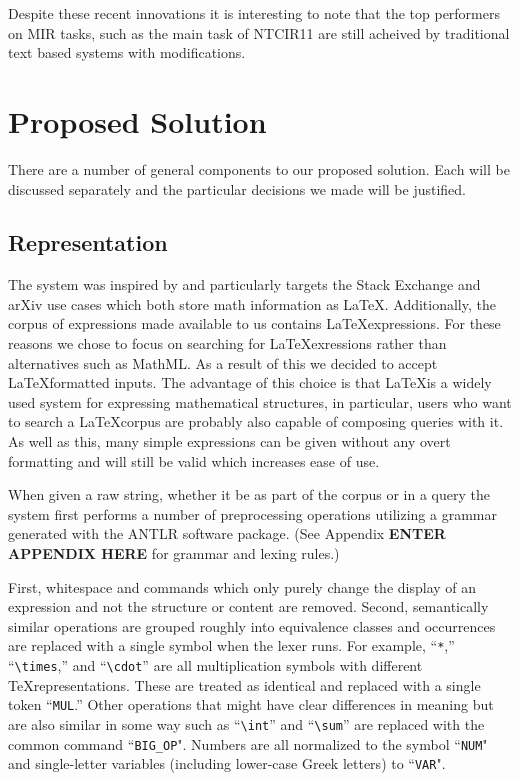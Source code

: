 \documentclass{sig-alternate}
\begin{document}
Despite these recent innovations it is interesting to note that the top performers on 
MIR tasks, such as the main task of NTCIR11 are still acheived by traditional text based
systems with modifications.

\section{Proposed Solution}
There are a number of general components to our proposed solution.
Each will be discussed separately and the particular 
decisions we made will be justified. 

\subsection{Representation}
The system was inspired by and particularly targets the Stack Exchange
and arXiv use cases which both store math information as LaTeX. 
Additionally, the corpus of expressions made available to us contains
\LaTeX expressions. For these reasons we chose to focus on searching
for \LaTeX exressions rather than alternatives such as MathML. As a 
result of this we decided to accept \LaTeX formatted inputs. The advantage
of this choice is that \LaTeX is a widely used system for expressing
mathematical structures, in particular, users who want to search
a \LaTeX corpus are probably also capable of composing queries with it.
As well as this, many simple expressions can be given without any 
overt formatting and will still be valid which increases ease of use.

When given a raw string, whether it be as part of the corpus or in 
a query the system first performs a number of preprocessing operations utilizing a grammar
generated with the ANTLR software package.  (See Appendix \textbf{ENTER APPENDIX HERE} for 
grammar and lexing rules.)

First, whitespace and commands which only purely change the display of an
expression and not the structure or content are removed. Second, 
semantically similar operations are grouped roughly into equivalence 
classes and occurrences are replaced with a single symbol when the lexer runs.
For example, ``\texttt{*},'' ``\texttt{\textbackslash times},'' and ``\texttt{\textbackslash cdot}'' are all multiplication symbols with different \TeX representations.  These are treated as identical and replaced with a single token ``\texttt{MUL}.'' Other operations that might have clear differences in meaning but are also
similar in some way such as ``\texttt{\textbackslash int}'' and ``\texttt{\textbackslash sum}'' are replaced with the common command ``\texttt{BIG\_OP}". Numbers are all normalized to the symbol ``\texttt{NUM}" and single-letter variables (including lower-case Greek letters) to ``\texttt{VAR}".
\end{document}
